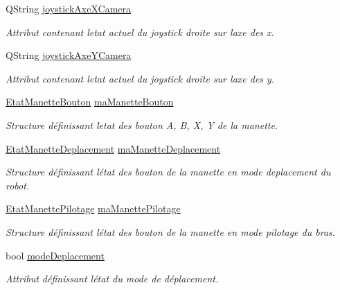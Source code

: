 \begin{DoxyCompactItemize}
Q\+String \hyperlink{class_manette_a0ca05a5c08455e74c8d944b96d8124a6}{joystick\+Axe\+X\+Camera}
\begin{DoxyCompactList}\small\item\em Attribut contenant l\textquotesingle{}etat actuel du joystick droite sur l\textquotesingle{}axe des x. \end{DoxyCompactList}\item 
Q\+String \hyperlink{class_manette_ab635d71c9e829d8950b9bbd13b9cdb01}{joystick\+Axe\+Y\+Camera}
\begin{DoxyCompactList}\small\item\em Attribut contenant l\textquotesingle{}etat actuel du joystick droite sur l\textquotesingle{}axe des y. \end{DoxyCompactList}\item 
\hyperlink{struct_etat_manette_bouton}{Etat\+Manette\+Bouton} \hyperlink{class_manette_ae69fd9baa0dad8a960fa93611b6a185f}{ma\+Manette\+Bouton}
\begin{DoxyCompactList}\small\item\em Structure définissant l\textquotesingle{}etat des bouton A, B, X, Y de la manette. \end{DoxyCompactList}\item 
\hyperlink{struct_etat_manette_deplacement}{Etat\+Manette\+Deplacement} \hyperlink{class_manette_af3d0f304c4c33e02bdf34fc99aa4dbff}{ma\+Manette\+Deplacement}
\begin{DoxyCompactList}\small\item\em Structure définissant l\textquotesingle{}état des bouton de la manette en mode deplacement du robot. \end{DoxyCompactList}\item 
\hyperlink{struct_etat_manette_pilotage}{Etat\+Manette\+Pilotage} \hyperlink{class_manette_aeb3e02eaeaec4c656f78ed8fc6dae342}{ma\+Manette\+Pilotage}
\begin{DoxyCompactList}\small\item\em Structure définissant l\textquotesingle{}état des bouton de la manette en mode pilotage du bras. \end{DoxyCompactList}\item 
bool \hyperlink{class_manette_a4dc6231c8cc65fac03f59d323fa9a038}{mode\+Deplacement}
\begin{DoxyCompactList}\small\item\em Attribut définissant l\textquotesingle{}état du mode de déplacement. \end{DoxyCompactList}\item 

\end{DoxyCompactItemize}
